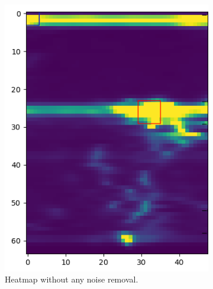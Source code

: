 \begin{figure}[t]
\begin{subfigure}{.45\textwidth}
  \centering
  \includegraphics[width=.9\linewidth]{figures/people_detection/heatmap_no_filtering2_crop.png}  
  \caption{Heatmap without any noise removal.}
  \label{fig:no_noise_removal}
\end{subfigure}
\begin{subfigure}{.45\textwidth}
  \centering

\end{subfigure}
\end{figure}
